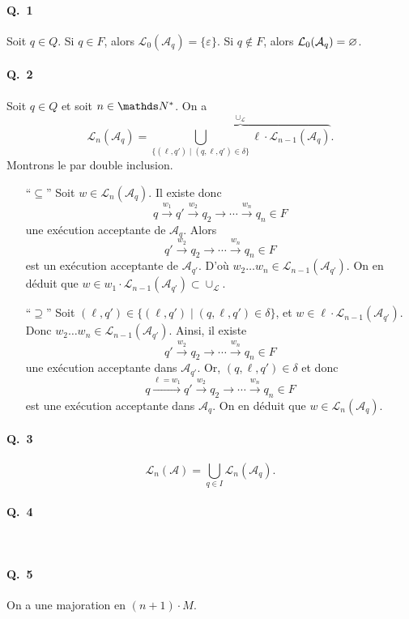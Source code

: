 \documentclass[a4paper]{article}
\begin{document}
	\paragraph{Q.\ 1}
	Soit $q \in Q$.
	Si $q \in F$, alors $\mathcal{L}_0(\mathcal{A}_q) = \{\varepsilon\}$.
	Si $q \not\in F$, alors $\mathcal{L}_0(\mathcal{A}_q) = \varnothing$.

	\paragraph{Q.\ 2}
	Soit $q \in Q$\/ et soit $n \in \N^*$. On a \[
		\mathcal{L}_n(\mathcal{A}_q) = \overbrace{\bigcup_{\{(\ell,q')  \mid (q,\ell,q') \in \delta\}} \ell \cdot \mathcal{L}_{n-1}(\mathcal{A}_q)}^{\cup_\mathcal{L}}
	.\]
	Montrons le par double inclusion.

	\begin{itemize}
		\item[``$\subseteq$'']
			Soit $w \in \mathcal{L}_n(\mathcal{A}_q)$. Il existe donc \[
				q \xrightarrow{w_1} q' \xrightarrow{w_2} q_2 \to \cdots \xrightarrow{w_n} q_n \in F
			\] une exécution acceptante de $\mathcal{A}_{q}$. Alors \[
				q' \xrightarrow{w_2} q_2 \to \cdots \xrightarrow{w_n} q_n \in F
			\] est un exécution acceptante de $\mathcal{A}_{q'}$. D'où $w_2\ldots w_n \in \mathcal{L}_{n-1}(\mathcal{A}_{q'})$. On en déduit que $w \in w_1 \cdot \mathcal{L}_{n-1}(\mathcal{A}_{q'}) \subset \cup_\mathcal{L}$.
		\item[``$\supseteq$'']
			Soit $(\ell, q') \in \{(\ell,q')  \mid (q, \ell, q') \in \delta\}$, et $w \in \ell \cdot \mathcal{L}_{n-1}(\mathcal{A}_{q'})$. Donc $w_2\ldots w_{n} \in \mathcal{L}_{n-1}(\mathcal{A}_{q'})$. Ainsi, il existe \[
				q' \xrightarrow{w_2} q_2 \to \cdots \xrightarrow{w_n} q_n \in F
			\] une exécution acceptante dans $\mathcal{A}_{q'}$. Or, $(q, \ell, q') \in \delta$\/ et donc \[
				q \xrightarrow{\ell = w_1} q' \xrightarrow{w_2} q_2 \to \cdots \xrightarrow{w_n} q_n \in F
			\] est une exécution acceptante dans $\mathcal{A}_q$. On en déduit que $w \in \mathcal{L}_n(\mathcal{A}_q)$.
	\end{itemize}

	\paragraph{Q.\ 3} \[
		\mathcal{L}_n(\mathcal{A}) = \bigcup_{q \in I} \mathcal{L}_n(\mathcal{A}_q)
	.\]

	\paragraph{Q.\ 4}~\\
	\begin{figure}[H]
		\centering
	\end{figure}
	\paragraph{Q.\ 5} On a une majoration en $(n+1) \cdot M$.
\end{document}
